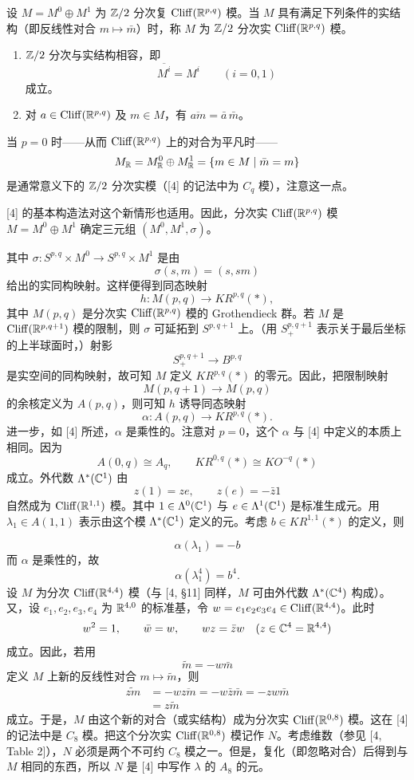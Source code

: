 设 $M=M^0\oplus M^1$ 为 $\mathbb{Z}/2$ 分次复 $\operatorname{Cliff}(\mathbb{R}^{p,q})$ 模。当 $M$ 具有满足下列条件的实结构（即反线性对合 $m\mapsto\bar m$）时，称 $M$ 为 $\mathbb{Z}/2$ 分次实 $\operatorname{Cliff}(\mathbb{R}^{p,q})$ 模。
\begin{enumerate}[label=(\roman*),leftmargin=2.2em,itemsep=2pt]
  \item $\mathbb{Z}/2$ 分次与实结构相容，即
  \[
    \overline{M^i}=M^i\qquad(i=0,1)
  \]
  成立。
  \item 对 $a\in\operatorname{Cliff}(\mathbb{R}^{p,q})$ 及 $m\in M$，有 $\overline{am}=\bar a\,\bar m$。
\end{enumerate}
当 $p=0$ 时——从而 $\operatorname{Cliff}(\mathbb{R}^{p,q})$ 上的对合为平凡时——
\[
  M_{\mathbb{R}}=M^0_{\mathbb{R}}\oplus M^1_{\mathbb{R}}=\{m\in M\mid \bar m=m\}
\]
是通常意义下的 $\mathbb{Z}/2$ 分次实模（[4] 的记法中为 $C_q$ 模），注意这一点。

[4] 的基本构造法对这个新情形也适用。因此，分次实 $\operatorname{Cliff}(\mathbb{R}^{p,q})$ 模 $M=M^0\oplus M^1$ 确定三元组 $(M^0,M^1,\sigma)$。

其中 $\sigma\colon S^{p,q}\times M^0\to S^{p,q}\times M^1$ 是由
\[
  \sigma(s,m)=(s,sm)
\]
给出的实同构映射。这样便得到同态映射
\[
  h\colon M(p,q)\to KR^{p,q}(*),
\]
其中 $M(p,q)$ 是分次实 $\operatorname{Cliff}(\mathbb{R}^{p,q})$ 模的 Grothendieck 群。若 $M$ 是 $\operatorname{Cliff}(\mathbb{R}^{p,q+1})$ 模的限制，则 $\sigma$ 可延拓到 $S^{p,q+1}$ 上。（用 $S^{p,q+1}_+$ 表示关于最后坐标的上半球面时，）射影
\[
  S^{p,q+1}_+\to B^{p,q}
\]
是实空间的同构映射，故可知 $M$ 定义 $KR^{p,q}(*)$ 的零元。因此，把限制映射
\[
  M(p,q+1)\to M(p,q)
\]
的余核定义为 $A(p,q)$，则可知 $h$ 诱导同态映射
\[
  \alpha\colon A(p,q)\to KR^{p,q}(*).
\]
进一步，如 [4] 所述，$\alpha$ 是乘性的。注意对 $p=0$，这个 $\alpha$ 与 [4] 中定义的本质上相同。因为
\[
  A(0,q)\cong A_q,\qquad KR^{0,q}(*)\cong KO^{-q}(*)
\]
成立。外代数 $\Lambda^*(\mathbb{C}^1)$ 由
\[
  z(1)=ze,\qquad z(e)=-\bar z 1
\]
自然成为 $\operatorname{Cliff}(\mathbb{R}^{1,1})$ 模。其中 $1\in\Lambda^0(\mathbb{C}^1)$ 与 $e\in\Lambda^1(\mathbb{C}^1)$ 是标准生成元。用 $\lambda_1\in A(1,1)$ 表示由这个模 $\Lambda^*(\mathbb{C}^1)$ 定义的元。考虑 $b\in KR^{1,1}(*)$ 的定义，则

\[
  \alpha(\lambda_1)=-b
\]
而 $\alpha$ 是乘性的，故
\[
  \alpha(\lambda_1^4)=b^4.
\]
设 $M$ 为分次 $\operatorname{Cliff}(\mathbb{R}^{4,4})$ 模（与 [4, §11] 同样，$M$ 可由外代数 $\Lambda^*(\mathbb{C}^4)$ 构成）。又，设 $e_1,e_2,e_3,e_4$ 为 $\mathbb{R}^{4,0}$ 的标准基，令 $w=e_1e_2e_3e_4\in\operatorname{Cliff}(\mathbb{R}^{4,4})$。此时
\[
  w^2=1,\qquad \bar w=w,\qquad wz=\bar z w\quad(z\in\mathbb{C}^4=\mathbb{R}^{4,4})
\]
成立。因此，若用
\[
  \tilde m=-w\bar m
\]
定义 $M$ 上新的反线性对合 $m\mapsto\tilde m$，则
\begin{align*}
  \widetilde{zm} &= -w\overline{zm} = -w\bar z\bar m = -zw\bar m\\
  &= z\tilde m
\end{align*}
成立。于是，$M$ 由这个新的对合（或实结构）成为分次实 $\operatorname{Cliff}(\mathbb{R}^{0,8})$ 模。这在 [4] 的记法中是 $C_8$ 模。把这个分次实 $\operatorname{Cliff}(\mathbb{R}^{0,8})$ 模记作 $N$。考虑维数（参见 [4, Table 2]），$N$ 必须是两个不可约 $C_8$ 模之一。但是，复化（即忽略对合）后得到与 $M$ 相同的东西，所以 $N$ 是 [4] 中写作 $\lambda$ 的 $A_8$ 的元。

